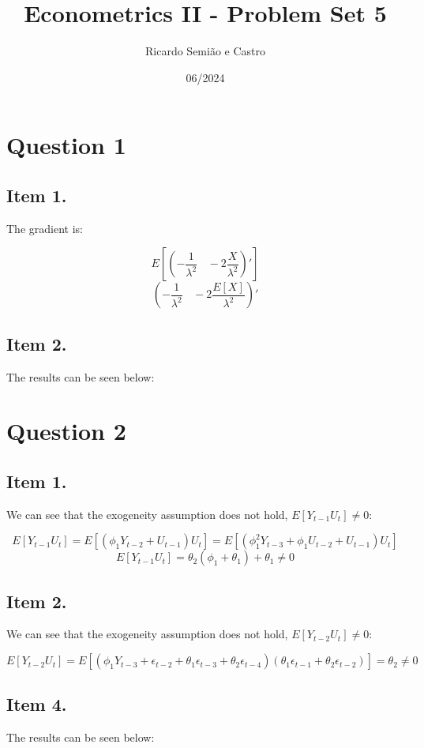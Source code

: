 \documentclass[12pt]{article}
\title{Econometrics II - Problem Set 5}
\author{Ricardo Semião e Castro}
\date{06/2024}
\begin{document}
\maketitle

\section*{Question 1}

\subsection*{Item 1.}

The gradient is:

$$
E[\left(-\frac{1}{\lambda^2} ~~~~ -2\frac{X}{\lambda^2}\right)']
$$
$$
\left(-\frac{1}{\lambda^2} ~~~~ -2\frac{E[X]}{\lambda^2}\right)'
$$


\subsection*{Item 2.}
The results can be seen below:





\section*{Question 2}

\subsection*{Item 1.}
We can see that the exogeneity assumption does not hold, $E[Y_{t-1}U_t] \neq 0$:

$$
E[Y_{t-1}U_t] = E[(\phi_1 Y_{t-2} + U_{t-1} )U_t] = E[(\phi^2_1 Y_{t-3} + \phi_1U_{t-2} + U_{t-1})U_t]
$$
$$
E[Y_{t-1}U_t] = \theta_2(\phi_1 + \theta_1) + \theta_1 \neq 0
$$

\subsection*{Item 2.}
We can see that the exogeneity assumption does not hold, $E[Y_{t-2}U_t] \neq 0$:

$$
E[Y_{t-2}U_t] = E[(\phi_1 Y_{t-3} + \epsilon_{t-2} + \theta_1\epsilon_{t-3} + \theta_2\epsilon_{t-4})(\theta_1\epsilon_{t-1} + \theta_2\epsilon_{t-2})] = \theta_2 \neq 0
$$


\subsection*{Item 4.}
The results can be seen below:
\end{document}

